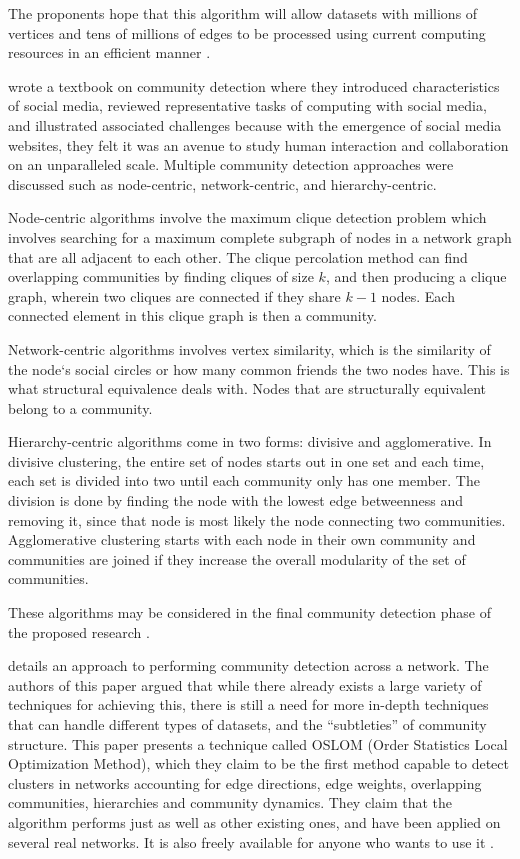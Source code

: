 The proponents hope that this algorithm will allow datasets with millions of vertices and tens of millions of edges to be processed using current computing resources in an efficient manner \cite{Clauset:2004}.

 wrote a textbook on community detection where they introduced characteristics of social media, reviewed representative tasks of computing with social media, and illustrated associated challenges because with the emergence of social media websites, they felt it was an avenue to study human interaction and collaboration on an unparalleled scale. Multiple community detection approaches were discussed such as node-centric, network-centric, and hierarchy-centric. 

Node-centric algorithms involve the maximum clique detection problem which involves searching for a maximum complete subgraph of nodes in a network graph that are all adjacent to each other. The clique percolation method can find overlapping communities by finding cliques of size $k$, and then producing a clique graph, wherein two cliques are connected if they share $k-1$ nodes. Each connected element in this clique graph is then a community.

Network-centric algorithms involves vertex similarity, which is the similarity of the node`s social circles or how many common friends the two nodes have. This is what structural equivalence deals with. Nodes that are structurally equivalent belong to a community. 

Hierarchy-centric algorithms come in two forms: divisive and agglomerative. In divisive clustering, the entire set of nodes starts out in one set and each time, each set is divided into two until each community only has one member. The division is done by finding the node with the lowest edge betweenness and removing it, since that node is most likely the node connecting two communities. Agglomerative clustering starts with each node in their own community and communities are joined if they increase the overall modularity of the set of communities. 

These algorithms may be considered in the final community detection phase of the proposed research \cite{Tang:2010}.

 details an approach to performing community detection across a network. The authors of this paper argued that while there already exists a large variety of techniques for achieving this, there is still a need for more in-depth techniques that can handle different types of datasets, and the ``subtleties'' of community structure. This paper presents a technique called OSLOM (Order Statistics Local Optimization Method), which they claim to be the  first method capable to detect clusters in networks accounting for edge directions, edge weights, overlapping communities, hierarchies and community dynamics. They claim that the algorithm performs just as well as other existing ones, and have been applied on several real networks. It is also freely available for anyone who wants to use it \cite{Lancichinetti:2011}.

